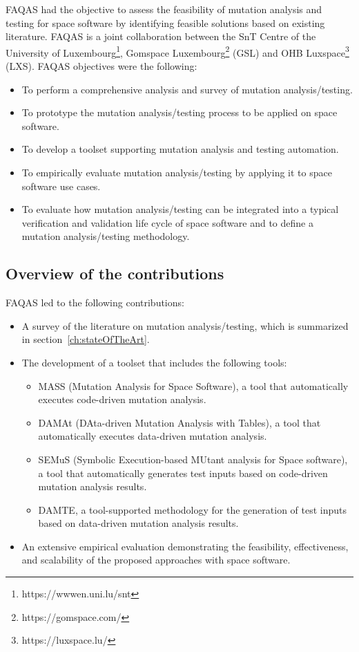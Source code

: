 FAQAS had the objective to assess the feasibility of mutation analysis and testing for space software by identifying feasible solutions based on existing literature.
FAQAS is a joint collaboration between the SnT Centre of the University of Luxembourg\footnote{https://wwwen.uni.lu/snt}, Gomspace Luxembourg\footnote{https://gomspace.com/} (GSL) and OHB Luxspace\footnote{https://luxspace.lu/} (LXS).
FAQAS objectives were the following:
\begin{itemize}
\item To perform a comprehensive analysis and survey of mutation analysis/testing.
\item To prototype the mutation analysis/testing process to be applied on space software.
\item To develop a toolset supporting mutation analysis and testing automation.
\item To empirically evaluate mutation analysis/testing by applying it to space software use cases.
\item To evaluate how mutation analysis/testing can be integrated into a typical verification and validation life cycle of space software and to define a mutation analysis/testing methodology.
\end{itemize}


\subsection*{Overview of the contributions}

FAQAS led to the following contributions:
\begin{itemize}
\item A survey of the literature on mutation analysis/testing, which is summarized in section~\ref{ch:stateOfTheArt}.
\item The development of a toolset that includes the following tools:
\begin{itemize}
\item MASS (Mutation Analysis for Space Software), a tool that automatically executes code-driven mutation analysis.
\item DAMAt (DAta-driven Mutation Analysis with Tables), a tool that automatically executes data-driven mutation analysis.
\item SEMuS (Symbolic Execution-based MUtant analysis for Space software), a tool that automatically generates test inputs based on code-driven mutation analysis results.
\item DAMTE, a tool-supported methodology for the generation of test inputs based on data-driven mutation analysis results.
\end{itemize}
\item An extensive empirical evaluation demonstrating the feasibility, effectiveness, and scalability of the proposed approaches with space software.
\end{itemize}

